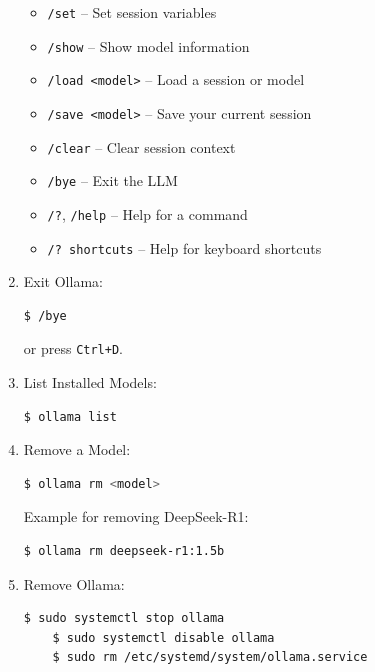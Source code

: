 \documentclass[a4paper,12pt]{article}
\begin{document}
\begin{enumerate}
    \begin{itemize}
        \item \texttt{/set} – Set session variables
        \item \texttt{/show} – Show model information
        \item \texttt{/load <model>} – Load a session or model
        \item \texttt{/save <model>} – Save your current session
        \item \texttt{/clear} – Clear session context
        \item \texttt{/bye} – Exit the LLM
        \item \texttt{/?}, \texttt{/help} – Help for a command
        \item \texttt{/? shortcuts} – Help for keyboard shortcuts
    \end{itemize}

    \item Exit Ollama:
    \begin{lstlisting}[language=bash, breaklines=true, breakatwhitespace=true, columns=fullflexible]
    $ /bye
    \end{lstlisting}
    or press \texttt{Ctrl+D}.

    \item List Installed Models:
    \begin{lstlisting}[language=bash, breaklines=true, breakatwhitespace=true, columns=fullflexible]
    $ ollama list
    \end{lstlisting}

    \item Remove a Model:
    \begin{lstlisting}[language=bash, breaklines=true, breakatwhitespace=true, columns=fullflexible]
    $ ollama rm <model>
    \end{lstlisting}
    Example for removing DeepSeek-R1:
    \begin{lstlisting}[language=bash, breaklines=true, breakatwhitespace=true, columns=fullflexible]
    $ ollama rm deepseek-r1:1.5b
    \end{lstlisting}

    \item Remove Ollama:
    \begin{lstlisting}[language=bash, breaklines=true, breakatwhitespace=true, columns=fullflexible]
    $ sudo systemctl stop ollama
    $ sudo systemctl disable ollama
    $ sudo rm /etc/systemd/system/ollama.service
    \end{lstlisting}

\end{enumerate}
\end{document}
